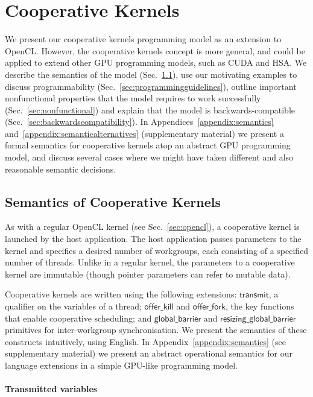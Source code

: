 \documentclass[numbers,nocopyrightspace,10pt]{sigplanconf}
\newcommand{\mysec}{Sec.~}
\newcommand{\transmit}{\mathsf{transmit}}
\newcommand{\offerfork}{\mathsf{offer\_fork}}
\newcommand{\offerkill}{\mathsf{offer\_kill}}
\newcommand{\globalbarrier}{\mathsf{global\_barrier}}
\newcommand{\resizingglobalbarrier}{\mathsf{resizing\_global\_barrier}}
\begin{document}
\section{Cooperative Kernels}\label{sec:cooperativekernels}

We present our cooperative kernels programming model as an extension
to OpenCL.  However, the cooperative kernels concept is more general,
and could be applied to extend other GPU programming models, such as
CUDA and HSA.  We describe the semantics of the model
(\mysec\ref{sec:semantics}), use our motivating examples to discuss
programmability (\mysec\ref{sec:programmingguidelines}), outline
important nonfunctional properties that the model requires to work
successfully (\mysec\ref{sec:nonfunctional}) and explain that the
model is backwards-compatible
(\mysec\ref{sec:backwardscompatibility}).
%
In Appendices~\ref{appendix:semantics} and~\ref{appendix:semanticalternatives} (supplementary material)
we present a formal semantics for cooperative kernels atop an abstract GPU programming model,
and discuss several cases where we
might have taken different and also reasonable semantic decisions.

\subsection{Semantics of Cooperative Kernels}\label{sec:semantics}

As with a regular OpenCL kernel (see \mysec\ref{sec:opencl}), a
cooperative kernel is launched by the host application.  The host
application passes parameters to the kernel and specifies a desired
number of workgroups, each consisting of a specified number of
threads.  Unlike in a regular kernel, the parameters to a cooperative kernel are immutable (though pointer
parameters can refer to mutable data).

Cooperative kernels are written using the following 
extensions: $\transmit$, a qualifier on the variables of a
thread; $\offerkill$ and $\offerfork$, the key functions that enable
cooperative scheduling; and $\globalbarrier$ and $\resizingglobalbarrier$
primitives for inter-workgroup synchronisation.
%
We present the semantics of these constructs intuitively, using English.
In Appendix~\ref{appendix:semantics} (see supplementary material) we present an abstract operational semantics for our language extensions in a simple GPU-like programming model.

\paragraph{Transmitted variables}
\end{document}
